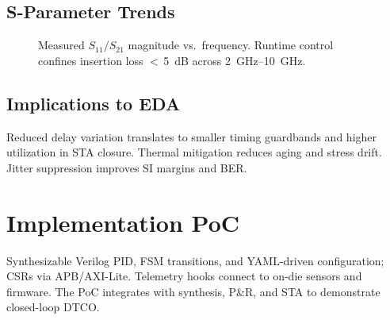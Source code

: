 \documentclass[conference]{IEEEtran}
\begin{document}
\subsection{S-Parameter Trends}
\begin{figure}[t]
\centering
{}
\caption{Measured $S_{11}/S_{21}$ magnitude vs.\ frequency. Runtime control confines insertion loss $<\,$\SI{5}{dB} across \SIrange{2}{10}{GHz}.}
\label{fig:sparam}
\end{figure}

\subsection{Implications to EDA}
Reduced delay variation translates to smaller timing guardbands and higher utilization in STA closure. Thermal mitigation reduces aging and stress drift. Jitter suppression improves SI margins and BER.

\section{Implementation PoC}
Synthesizable Verilog PID, FSM transitions, and YAML-driven configuration; CSRs via APB/AXI-Lite. Telemetry hooks connect to on-die sensors and firmware. The PoC integrates with synthesis, P\&R, and STA to demonstrate closed-loop DTCO.
\end{document}
